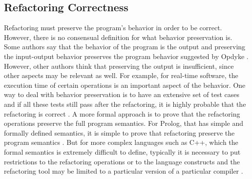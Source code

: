 

\subsection{Refactoring Correctness}
%
Refactoring must preserve the program's behavior in order to be correct.
However, there is no consensual definition for what behavior preservation is.
Some authors say that the behavior of the program is the output and preserving the input-output behavior preserves the program behavior suggested by Opdyke \cite{opdyke1992refactoring}.
However, other authors think that preserving the output is insufficient, since other aspects may be relevant as well. For example, for real-time software, the execution time of certain operations is an important aspect of the behavior. 
One way to deal with behavior preservation is to have an extensive set of test cases and if all these tests still pass after the refactoring, it is highly probable that the refactoring is correct \cite{mens2004survey}.
A more formal approach is to prove that the refactoring operations preserve the full program semantics. For Prolog, that has simple and formally defined semantics, it is simple to prove that refactoring preserve the program semantics \cite{proietti1991semantics}. %
But for more complex languages such as C++, which the formal semantics is extremely difficult to define, typically it is necessary to put restrictions to the refactoring operations or to the language constructs and the refactoring tool may be limited to a particular version of a particular compiler \cite{tokuda2001evolving}.%



